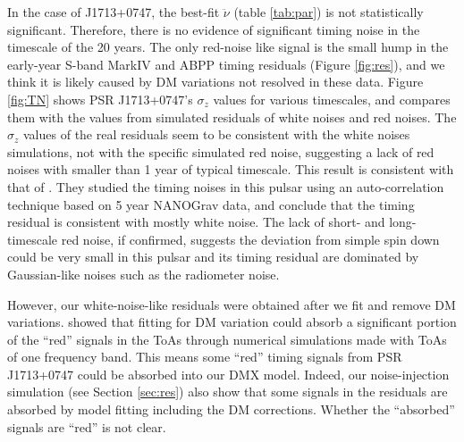 In the case of J1713+0747, the
best-fit $\ddot{\nu}$ (table \ref{tab:par}) is not statistically significant. 
Therefore, there is no evidence of significant timing noise in the
timescale of the 20 years. The only red-noise like
signal is the small hump in the early-year S-band MarkIV and ABPP timing residuals (Figure
\ref{fig:res}), and we think it is likely caused by DM variations not resolved in
these data. Figure \ref{fig:TN} 
shows PSR J1713+0747's $\sigma_z$ values for various timescales, and compares them
with the values from simulated residuals of white noises and
red noises. The $\sigma_z$ values of the real residuals seem to be consistent 
with the white noises simulations, not with the specific simulated red noise,
suggesting a lack of red noises with smaller than 1 year of typical timescale. 
This result is consistent with that of \citet{pjl+13}. They
studied the timing noises in this pulsar using an auto-correlation technique
based on 5 year NANOGrav data, and conclude that the timing residual is
consistent with mostly white noise.
The lack of short- and long-timescale red noise, if confirmed,  suggests the
deviation from simple spin down could be very small in this pulsar and its timing
residual are dominated by Gaussian-like noises such as the radiometer noise.

However, our white-noise-like residuals were obtained after we fit and remove
DM variations. \citet{kcs+13} showed that fitting for DM variation could
absorb a significant portion of the ``red'' signals in the ToAs through
numerical simulations made with ToAs of one frequency band. This means
some ``red'' timing signals from PSR J1713+0747 could be absorbed into 
our DMX model. Indeed, our noise-injection simulation (see Section
\ref{sec:res})
also show that some signals in the residuals are absorbed by model fitting
including the DM corrections.
Whether the ``absorbed'' signals are ``red'' is not clear.


